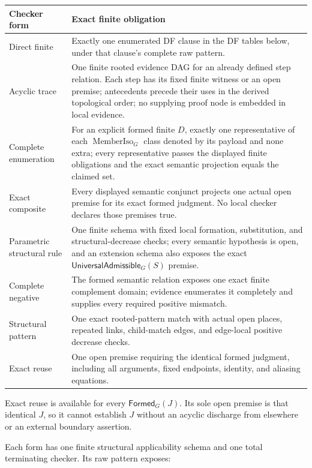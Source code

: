 \documentclass[11pt,twoside]{article}
\newcommand{\Formed}{\mathsf{Formed}}
\newcommand{\UniversalAdmissible}{\mathsf{UniversalAdmissible}}
\begin{document}
\begin{longtable}{>{\raggedright\arraybackslash}p{}
                  >{\raggedright\arraybackslash}p{}}
\toprule
Checker form & Exact finite obligation\\
\midrule
\endhead%
Direct finite &
Exactly one enumerated DF clause in the DF tables below, under
that clause's complete raw pattern.\\
Acyclic trace &
One finite rooted evidence DAG for an already defined step relation.  Each step
has its fixed finite witness or an open premise; antecedents precede their uses in
the derived topological order; no supplying proof node is embedded in local
evidence.\\
Complete enumeration &
For an explicit formed finite \(D\), exactly one representative of each
\(\operatorname{MemberIso}_G\) class denoted by its payload and none extra; every
representative passes the displayed finite obligations and the exact semantic
projection equals the claimed set.\\
Exact composite &
Every displayed semantic conjunct projects one actual open premise for its exact
formed judgment.  No local checker declares those premises true.\\
Parametric structural rule &
One finite schema with fixed local formation, substitution, and structural-decrease
checks; every semantic hypothesis is open, and an extension schema also exposes
the exact \(\UniversalAdmissible_G(S)\) premise.\\
Complete negative &
The formed semantic relation exposes one exact finite complement domain; evidence
enumerates it completely and supplies every required positive mismatch.\\
Structural pattern &
One exact rooted-pattern match with actual open places, repeated links,
child-match edges, and edge-local positive decrease checks.\\
Exact reuse &
One open premise requiring the identical formed judgment, including all arguments,
fixed endpoints, identity, and aliasing equations.\\
\bottomrule
\end{longtable}

Exact reuse is available for every \(\Formed_G(J)\).  Its sole open premise is
that identical \(J\), so it cannot establish \(J\) without an acyclic discharge
from elsewhere or an external boundary assertion.

Each form has one finite structural applicability schema and one total terminating
checker.  Its raw pattern exposes:
\end{document}
